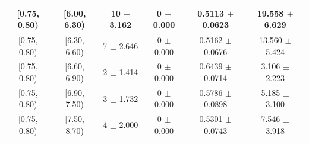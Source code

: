 \begin{longtable}{|c|c|c|c|c|c|}
\hline
[0.75, 0.80) & [6.00, 6.30) & 10 $\pm$ 3.162 & 0 $\pm$ 0.000 & 0.5113 $\pm$ 0.0623 & 19.558 $\pm$ 6.629 \\ 
\hline
[0.75, 0.80) & [6.30, 6.60) & 7 $\pm$ 2.646 & 0 $\pm$ 0.000 & 0.5162 $\pm$ 0.0676 & 13.560 $\pm$ 5.424 \\ 
\hline
[0.75, 0.80) & [6.60, 6.90) & 2 $\pm$ 1.414 & 0 $\pm$ 0.000 & 0.6439 $\pm$ 0.0714 & 3.106 $\pm$ 2.223 \\ 
\hline
[0.75, 0.80) & [6.90, 7.50) & 3 $\pm$ 1.732 & 0 $\pm$ 0.000 & 0.5786 $\pm$ 0.0898 & 5.185 $\pm$ 3.100 \\ 
\hline
[0.75, 0.80) & [7.50, 8.70) & 4 $\pm$ 2.000 & 0 $\pm$ 0.000 & 0.5301 $\pm$ 0.0743 & 7.546 $\pm$ 3.918 \\ 
\hline
\end{longtable}
